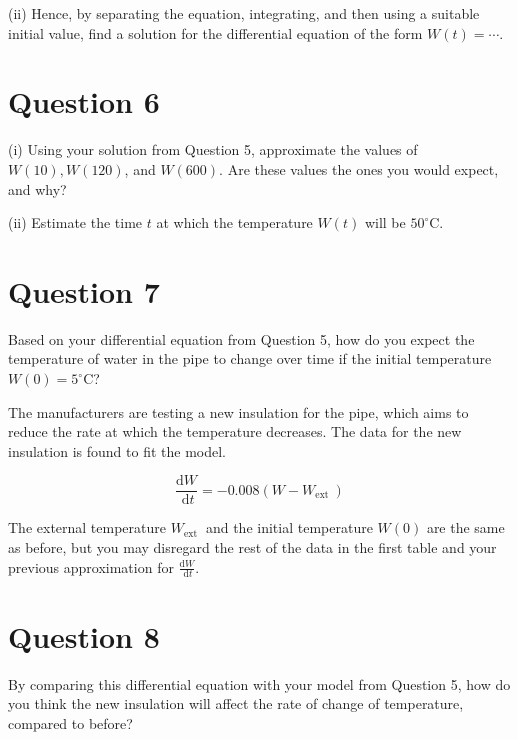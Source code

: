 \documentclass[12pt]{article}
\begin{document}
(ii) Hence, by separating the equation, integrating, and then using a suitable initial value, find a solution for the differential equation of the form $W(t)=\cdots$.

\section*{Question 6}
(i) Using your solution from Question 5, approximate the values of $W(10), W(120)$, and $W(600)$. Are these values the ones you would expect, and why?

(ii) Estimate the time $t$ at which the temperature $W(t)$ will be $50^{\circ} \mathrm{C}$.

\section*{Question 7}
Based on your differential equation from Question 5, how do you expect the temperature of water in the pipe to change over time if the initial temperature $W(0)=5^{\circ} \mathrm{C}$?

The manufacturers are testing a new insulation for the pipe, which aims to reduce the rate at which the temperature decreases. The data for the new insulation is found to fit the model.

$$
\frac{\mathrm{d} W}{\mathrm{~d} t}=-0.008\left(W-W_{\text {ext }}\right)
$$

The external temperature $W_{\text {ext }}$ and the initial temperature $W(0)$ are the same as before, but you may disregard the rest of the data in the first table and your previous approximation for $\frac{\mathrm{d} W}{\mathrm{~d} t}$.

\section*{Question 8}
By comparing this differential equation with your model from Question 5, how do you think the new insulation will affect the rate of change of temperature, compared to before?
\end{document}
